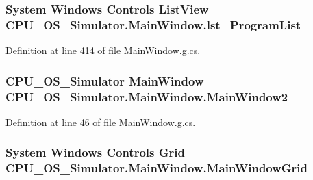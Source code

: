 \subsubsection[{lst\+\_\+\+Program\+List}]{\setlength{\rightskip}{0pt plus 5cm}System Windows Controls List\+View C\+P\+U\+\_\+\+O\+S\+\_\+\+Simulator.\+Main\+Window.\+lst\+\_\+\+Program\+List\hspace{0.3cm}{\ttfamily [package]}}\label{class_c_p_u___o_s___simulator_1_1_main_window_ab33f21e0f19eab104e6f67f44d89daeb}


Definition at line 414 of file Main\+Window.\+g.\+cs.

\hypertarget{class_c_p_u___o_s___simulator_1_1_main_window_adf996cda04d3cf426847b8fd8981ee66}{}
\subsubsection[{Main\+Window2}]{\setlength{\rightskip}{0pt plus 5cm}C\+P\+U\+\_\+\+O\+S\+\_\+\+Simulator {\bf Main\+Window} C\+P\+U\+\_\+\+O\+S\+\_\+\+Simulator.\+Main\+Window.\+Main\+Window2\hspace{0.3cm}{\ttfamily [package]}}\label{class_c_p_u___o_s___simulator_1_1_main_window_adf996cda04d3cf426847b8fd8981ee66}


Definition at line 46 of file Main\+Window.\+g.\+cs.

\hypertarget{class_c_p_u___o_s___simulator_1_1_main_window_a5c56d82a7b611446e81b7baa3229d76b}{}
\subsubsection[{Main\+Window\+Grid}]{\setlength{\rightskip}{0pt plus 5cm}System Windows Controls Grid C\+P\+U\+\_\+\+O\+S\+\_\+\+Simulator.\+Main\+Window.\+Main\+Window\+Grid\hspace{0.3cm}{\ttfamily [package]}}\label{class_c_p_u___o_s___simulator_1_1_main_window_a5c56d82a7b611446e81b7baa3229d76b}


